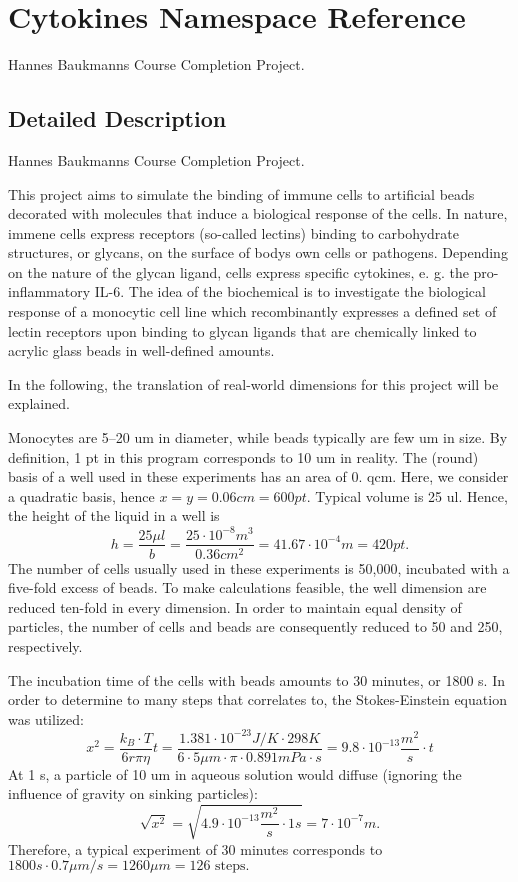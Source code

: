 \hypertarget{namespace_cytokines}{}\section{Cytokines Namespace Reference}
\label{namespace_cytokines}


Hannes Baukmann\textquotesingle{}s Course Completion Project.  




\subsection{Detailed Description}
Hannes Baukmann\textquotesingle{}s Course Completion Project. 

This project aims to simulate the binding of immune cells to artificial beads decorated with molecules that induce a biological response of the cells. In nature, immene cells express receptors (so-\/called lectins) binding to carbohydrate structures, or glycans, on the surface of body\textquotesingle{}s own cells or pathogens. Depending on the nature of the glycan ligand, cells express specific cytokines, e. g. the pro-\/inflammatory I\+L-\/6. The idea of the biochemical is to investigate the biological response of a monocytic cell line which recombinantly expresses a defined set of lectin receptors upon binding to glycan ligands that are chemically linked to acrylic glass beads in well-\/defined amounts.

In the following, the translation of real-\/world dimensions for this project will be explained.

Monocytes are 5--20 um in diameter, while beads typically are few um in size. By definition, 1 pt in this program corresponds to 10 um in reality. The (round) basis of a well used in these experiments has an area of 0. qcm. Here, we consider a quadratic basis, hence $x=y=0.06 cm=600 pt$. Typical volume is 25 ul. Hence, the height of the liquid in a well is \[ h = \frac{25 \mu l}{b} = \frac{25 \cdot 10^{-8} m^3}{0.36 cm^2} = 41.67 \cdot 10^{-4} m = 420 pt. \] The number of cells usually used in these experiments is 50,000, incubated with a five-\/fold excess of beads. To make calculations feasible, the well dimension are reduced ten-\/fold in every dimension. In order to maintain equal density of particles, the number of cells and beads are consequently reduced to 50 and 250, respectively.

The incubation time of the cells with beads amounts to 30 minutes, or 1800 s. In order to determine to many steps that correlates to, the Stokes-\/\+Einstein equation was utilized\+: \[ x^2 = \frac{k_B \cdot T}{6r \pi \eta} t = \frac{1.381 \cdot 10^{-23} J/K \cdot 298 K}{6 \cdot 5 \mu m \cdot \pi \cdot 0.891 mPa \cdot s} = 9.8 \cdot 10^{-13} \frac{m^2}{s} \cdot t \] At 1 s, a particle of 10 um in aqueous solution would diffuse (ignoring the influence of gravity on sinking particles)\+: \[ \sqrt{x^2} = \sqrt{4.9 \cdot 10^{-13} \frac{m^2}{s} \cdot 1s} = 7 \cdot 10^{-7} m.\] Therefore, a typical experiment of 30 minutes corresponds to $ 1800 s \cdot 0.7 \mu m/s = 1260 \mu m = 126\mbox{ steps}. $

